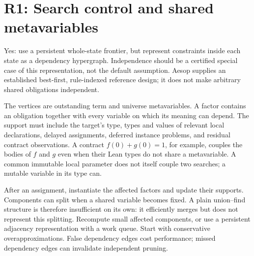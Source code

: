 \section{R1: Search control and shared metavariables}\label{sec:search}


\answer Yes: use a persistent whole-state frontier, but represent constraints inside each state as a dependency hypergraph. Independence should be a certified special case of this representation, not the default assumption. Aesop supplies an established best-first, rule-indexed reference design; it does not make arbitrary shared obligations independent.\cite{aesop}

The vertices are outstanding term and universe metavariables. A factor contains an obligation together with every variable on which its meaning can depend. The support must include the target's type, types and values of relevant local declarations, delayed assignments, deferred instance problems, and residual contract observations. A contract $f(0)+g(0)=1$, for example, couples the bodies of $f$ and $g$ even when their Lean types do not share a metavariable. A common immutable local parameter does not itself couple two searches; a mutable variable in its type can.

After an assignment, instantiate the affected factors and update their supports. Components can split when a shared variable becomes fixed. A plain union--find structure is therefore insufficient on its own: it efficiently merges but does not represent this splitting. Recompute small affected components, or use a persistent adjacency representation with a work queue. Start with conservative overapproximations. False dependency edges cost performance; missed dependency edges can invalidate independent pruning.

